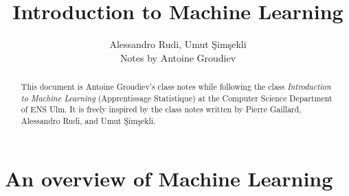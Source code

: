 \documentclass{../cs-classes/cs-classes}
\title{Introduction to Machine Learning}
\author{Alessandro Rudi, Umut \c{S}im\c{s}ekli\\ Notes by Antoine Groudiev}
\begin{document}
\begin{abstract}
    This document is Antoine Groudiev's class notes while following the class \emph{Introduction to Machine Learning} (Apprentissage Statistique) at the Computer Science Department of ENS Ulm. It is freely inspired by the class notes written by Pierre Gaillard, Alessandro Rudi, and Umut \c{S}im\c{s}ekli. 
\end{abstract}
\tableofcontents
\newpage

\section{An overview of Machine Learning}
%
%
%
\end{document}
